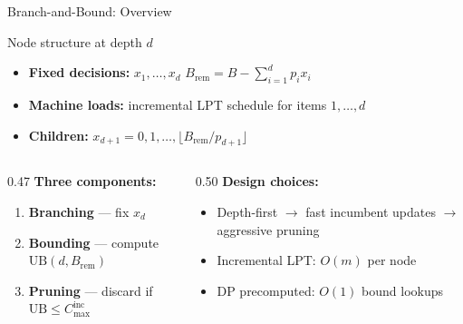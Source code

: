 \documentclass[fleqn,11pt,aspectratio=43]{beamer}
\newcommand{\Cinc}{C_{\max}^{\mathrm{inc}}}
\newcommand{\Brem}{B_{\mathrm{rem}}}
\newcommand{\UB}{\mathrm{UB}}
\begin{document}
\begin{frame}[shrink=8]{Branch-and-Bound: Overview}
  \begin{block}{Node structure at depth $d$}
    \begin{itemize}
      \item \textbf{Fixed decisions:} $x_1,\ldots,x_d$\quad
            $\Brem = B - \sum_{i=1}^{d}p_ix_i$
      \item \textbf{Machine loads:} incremental LPT schedule for items $1,\ldots,d$
      \item \textbf{Children:} $x_{d+1}=0,1,\ldots,\lfloor\Brem/p_{d+1}\rfloor$
    \end{itemize}
  \end{block}
  \begin{columns}[T]
    \begin{column}{0.47\textwidth}
      \textbf{Three components:}
      \begin{enumerate}
        \item \textbf{Branching} — fix $x_{d}$
        \item \textbf{Bounding} — compute $\UB(d,\Brem)$
        \item \textbf{Pruning} — discard if $\UB\leq\Cinc$
      \end{enumerate}
    \end{column}
    \begin{column}{0.50\textwidth}
      \textbf{Design choices:}
      \begin{itemize}
        \item Depth-first $\to$ fast incumbent updates $\to$ aggressive pruning
        \item Incremental LPT: $O(m)$ per node
        \item DP precomputed: $O(1)$ bound lookups
      \end{itemize}
    \end{column}
  \end{columns}
\end{frame}
\end{document}
